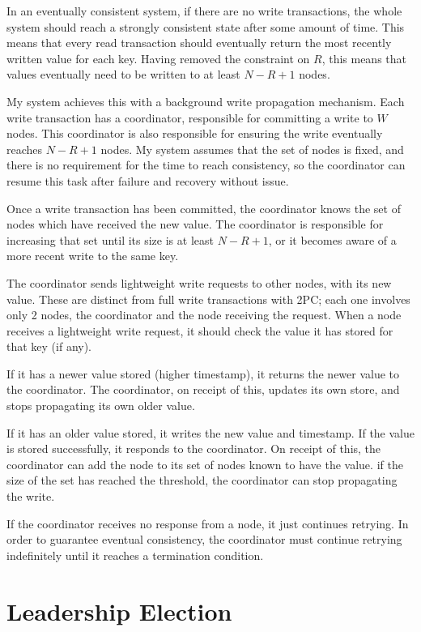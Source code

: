 \documentclass[12pt,a4paper,twoside,openany]{report}
\begin{document}
In an eventually consistent system, if there are no write transactions, the whole system should reach a strongly consistent state after some amount of time. This means that every read transaction should eventually return the most recently written value for each key. Having removed the constraint on $R$, this means that values eventually need to be written to at least $N - R + 1$ nodes.

My system achieves this with a background write propagation mechanism. Each write transaction has a coordinator, responsible for committing a write to $W$ nodes. This coordinator is also responsible for ensuring the write eventually reaches $N - R + 1$ nodes. My system assumes that the set of nodes is fixed, and there is no requirement for the time to reach consistency, so the coordinator can resume this task after failure and recovery without issue.

Once a write transaction has been committed, the coordinator knows the set of nodes which have received the new value. The coordinator is responsible for increasing that set until its size is at least $N - R + 1$, or it becomes aware of a more recent write to the same key.

The coordinator sends lightweight write requests to other nodes, with its new value. These are distinct from full write transactions with 2PC; each one involves only 2 nodes, the coordinator and the node receiving the request. When a node receives a lightweight write request, it should check the value it has stored for that key (if any).

If it has a newer value stored (higher timestamp), it returns the newer value to the coordinator. The coordinator, on receipt of this, updates its own store, and stops propagating its own older value.

If it has an older value stored, it writes the new value and timestamp. If the value is stored successfully, it responds to the coordinator. On receipt of this, the coordinator can add the node to its set of nodes known to have the value. if the size of the set has reached the threshold, the coordinator can stop propagating the write.

If the coordinator receives no response from a node, it just continues retrying. In order to guarantee eventual consistency, the coordinator must continue retrying indefinitely until it reaches a termination condition.

\section{Leadership Election}
\end{document}
